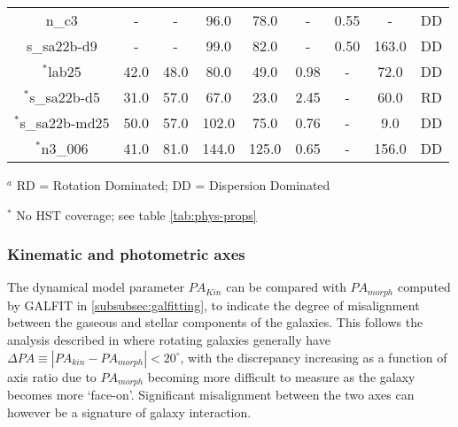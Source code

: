 \documentclass[fleqn,usenatbib]{mn2e}
\begin{document}
\begin{table*}
\begin{threeparttable}
\begin{tabular}{ccccccccc}
n\_c3         & -                    & -                      & 96.0                  & 78.0                   & -        & 0.55       & -  & DD     \\
s\_sa22b-d9   & -                    & -                      & 99.0                  & 82.0                   & -      & 0.50       & 163.0 & DD    \\
$^{*}$lab25         & 42.0                    & 48.0                     & 80.0                  & 49.0                   & 0.98       & -       & 72.0 & DD    \\
$^{*}$s\_sa22b-d5   & 31.0                    & 57.0                     & 67.0                  & 23.0                   & 2.45      & -       & 60.0 & RD     \\
$^{*}$s\_sa22b-md25 & 50.0                    & 57.0                     & 102.0                 & 75.0                   & 0.76       & -       & 9.0 & DD      \\
$^{*}$n3\_006       & 41.0                    & 81.0                     & 144.0                 & 125.0                  & 0.65      & -       & 156.0 & DD 

\end{tabular}
\begin{tablenotes}
      \small
      \item $^{a}$ RD = Rotation Dominated; DD = Dispersion Dominated
      \item $^{*}$ No HST coverage; see table \ref{tab:phys-props}
    \end{tablenotes}
  \end{threeparttable}
  \end{table*}


\subsubsection{Kinematic and photometric axes}\label{subsubsection:kin_and_phot}

The dynamical model parameter $PA_{Kin}$ can be compared with $PA_{morph}$ computed by GALFIT in \cref{subsubsec:galfitting}, to indicate the degree of misalignment between the gaseous and stellar components of the galaxies.
This follows the analysis described in \citep[e.g.][]{Epinat2008,Epinat2012,Barrera-Ballesteros2014,Barrera-Ballesteros2015,Wisnioski2015,Harrison2017} where rotating galaxies generally have $\Delta PA \equiv |PA_{kin}-PA_{morph}| < 20^{\circ}$, with the discrepancy increasing as a function of axis ratio due to $PA_{morph}$ becoming more difficult to measure as the galaxy becomes more `face-on'.
Significant misalignment between the two axes can however be a signature of galaxy interaction.
\end{document}
